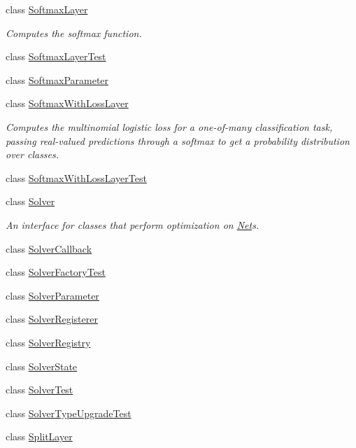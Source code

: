 \begin{DoxyCompactItemize}
class \mbox{\hyperlink{classcaffe_1_1_softmax_layer}{Softmax\+Layer}}
\begin{DoxyCompactList}\small\item\em Computes the softmax function. \end{DoxyCompactList}\item 
class \mbox{\hyperlink{classcaffe_1_1_softmax_layer_test}{Softmax\+Layer\+Test}}
\item 
class \mbox{\hyperlink{classcaffe_1_1_softmax_parameter}{Softmax\+Parameter}}
\item 
class \mbox{\hyperlink{classcaffe_1_1_softmax_with_loss_layer}{Softmax\+With\+Loss\+Layer}}
\begin{DoxyCompactList}\small\item\em Computes the multinomial logistic loss for a one-\/of-\/many classification task, passing real-\/valued predictions through a softmax to get a probability distribution over classes. \end{DoxyCompactList}\item 
class \mbox{\hyperlink{classcaffe_1_1_softmax_with_loss_layer_test}{Softmax\+With\+Loss\+Layer\+Test}}
\item 
class \mbox{\hyperlink{classcaffe_1_1_solver}{Solver}}
\begin{DoxyCompactList}\small\item\em An interface for classes that perform optimization on \mbox{\hyperlink{classcaffe_1_1_net}{Net}}s. \end{DoxyCompactList}\item 
class \mbox{\hyperlink{classcaffe_1_1_solver_callback}{Solver\+Callback}}
\item 
class \mbox{\hyperlink{classcaffe_1_1_solver_factory_test}{Solver\+Factory\+Test}}
\item 
class \mbox{\hyperlink{classcaffe_1_1_solver_parameter}{Solver\+Parameter}}
\item 
class \mbox{\hyperlink{classcaffe_1_1_solver_registerer}{Solver\+Registerer}}
\item 
class \mbox{\hyperlink{classcaffe_1_1_solver_registry}{Solver\+Registry}}
\item 
class \mbox{\hyperlink{classcaffe_1_1_solver_state}{Solver\+State}}
\item 
class \mbox{\hyperlink{classcaffe_1_1_solver_test}{Solver\+Test}}
\item 
class \mbox{\hyperlink{classcaffe_1_1_solver_type_upgrade_test}{Solver\+Type\+Upgrade\+Test}}
\item 
class \mbox{\hyperlink{classcaffe_1_1_split_layer}{Split\+Layer}}

\end{DoxyCompactItemize}
